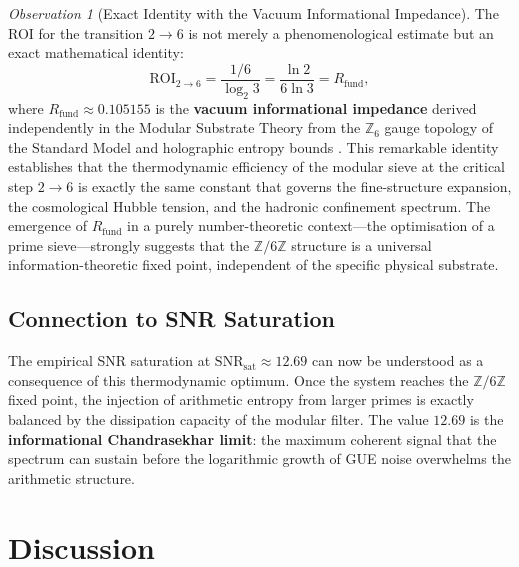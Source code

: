 \documentclass[12pt,a4paper]{article}
\theoremstyle{plain}
\theoremstyle{definition}
\theoremstyle{remark}
\newtheorem{observation}[theorem]{Observation}
\begin{document}
\begin{observation}[Exact Identity with the Vacuum Informational Impedance]
\label{obs:rfund_identity}
The ROI for the transition $2 \to 6$ is not merely a phenomenological estimate but an exact mathematical identity:
\begin{equation}
\mathrm{ROI}_{2 \to 6} = \frac{1/6}{\log_2 3} = \frac{\ln 2}{6 \ln 3} = R_{\mathrm{fund}},
\label{eq:roi_rfund}
\end{equation}
where $R_{\mathrm{fund}} \approx 0.105155$ is the \textbf{vacuum informational impedance} derived independently in the Modular Substrate Theory from the $\mathbb{Z}_6$ gauge topology of the Standard Model and holographic entropy bounds \cite{MSTfound}. This remarkable identity establishes that the thermodynamic efficiency of the modular sieve at the critical step $2 \to 6$ is exactly the same constant that governs the fine-structure expansion, the cosmological Hubble tension, and the hadronic confinement spectrum. The emergence of $R_{\mathrm{fund}}$ in a purely number-theoretic context---the optimisation of a prime sieve---strongly suggests that the $\mathbb{Z}/6\mathbb{Z}$ structure is a universal information-theoretic fixed point, independent of the specific physical substrate.
\end{observation}

\subsection{Connection to SNR Saturation}
The empirical SNR saturation at $\mathrm{SNR}_{\mathrm{sat}} \approx 12.69$ \cite{R1} can now be understood as a consequence of this thermodynamic optimum. Once the system reaches the $\mathbb{Z}/6\mathbb{Z}$ fixed point, the injection of arithmetic entropy from larger primes is exactly balanced by the dissipation capacity of the modular filter. The value $12.69$ is the \textbf{informational Chandrasekhar limit}: the maximum coherent signal that the spectrum can sustain before the logarithmic growth of GUE noise overwhelms the arithmetic structure.

\section{Discussion}
\label{sec:discussion}
\end{document}
